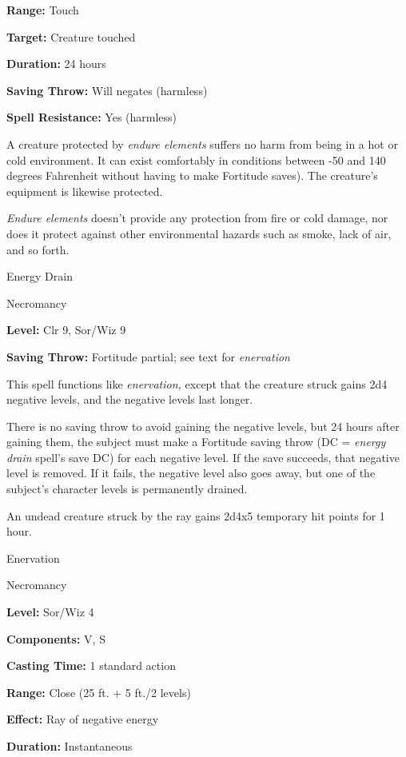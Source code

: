 \documentclass{article}
\begin{document}
\textbf{Range:} Touch

\textbf{Target:} Creature touched

\textbf{Duration:} 24 hours

\textbf{Saving Throw: }Will negates (harmless)

\textbf{Spell Resistance:} Yes (harmless)

A creature protected by \textit{endure elements }suffers no harm from being in 
a hot or cold environment. It can exist comfortably in conditions between -50 and 
140 degrees Fahrenheit without having to make Fortitude saves). The creature's 
equipment is likewise protected.

\textit{Endure elements }doesn't provide any protection from fire or cold damage, 
nor does it protect against other environmental hazards such as smoke, lack of 
air, and so forth.

\vspace{12pt}
Energy Drain

Necromancy

\textbf{Level:} Clr 9, Sor/Wiz 9

\textbf{Saving Throw:} Fortitude partial; see text for \textit{enervation}

This spell functions like \textit{enervation, }except that the creature struck 
gains 2d4 negative levels, and the negative levels last longer.

There is no saving throw to avoid gaining the negative levels, but 24 hours after 
gaining them, the subject must make a Fortitude saving throw (DC = \textit{energy 
drain }spell's save DC) for each negative level. If the save succeeds, that negative 
level is removed. If it fails, the negative level also goes away, but one of the 
subject's character levels is permanently drained.

An undead creature struck by the ray gains 2d4x5 temporary hit points for 1 hour.

\vspace{12pt}
Enervation

Necromancy

\textbf{Level:} Sor/Wiz 4

\textbf{Components:} V, S

\textbf{Casting Time:} 1 standard action

\textbf{Range:} Close (25 ft. + 5 ft./2 levels)

\textbf{Effect:} Ray of negative energy

\textbf{Duration:} Instantaneous
\end{document}

